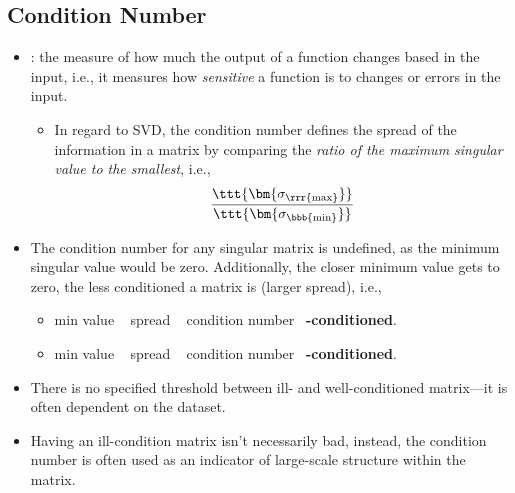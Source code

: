 \begin{itemize}
  \subsection{Condition Number}\label{Condition Number}
  \begin{itemize}
    \item {}: the measure of how much the output of a function changes based in the input, i.e., it measures how \emph{sensitive} a function is to changes or errors in the input.
      \begin{itemize}
        \item In regard to SVD, the condition number defines the spread of the information in a matrix by comparing the \emph{ratio of the maximum singular value to the smallest}, i.e.,
        \[%
        \frac{\ttt{\bm{\sigma_{\rrr{\max}}}}}{\ttt{\bm{\sigma_{\bbb{\min}}}}}
        \]%
      \end{itemize}
    \item The condition number for any singular matrix is undefined, as the minimum singular value would be zero. Additionally, the closer minimum value gets to zero, the less conditioned a matrix is (larger spread), i.e.,
    \begin{itemize}
      \item {} min value \to~ spread \to~ condition number \to~\textbf{-conditioned}.
      \item {} min value \to~ spread \to~ condition number \to~\textbf{-conditioned}.
    \end{itemize}
    \item There is no specified threshold between ill- and well-conditioned matrix---it is often dependent on the dataset.
    \item Having an ill-condition matrix isn't necessarily bad, instead, the condition number is often used as an indicator of large-scale structure within the matrix.
  \end{itemize}
  
\end{itemize}



